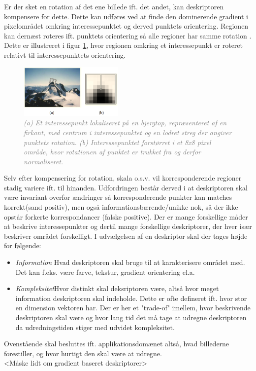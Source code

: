Er der sket en rotation af det ene billede ift. det andet, kan deskriptoren kompensere for dette. Dette kan udføres ved at finde den dominerende gradient i pixelområdet omkring interessepunktet og derved punktets orientering. Regionen kan dernæst roteres ift. punktets orientering så alle regioner har samme rotation \cite{bjerg}. Dette er illustreret i figur \ref{fig:bjerg}, hvor regionen omkring et interessepunkt er roteret relativt til interessepunktets orientering.
\begin{figure}[H]
    \centering
    \includegraphics[width=0.45\textwidth]{fig/21.png}
    \vspace{-0.5em} 
    \begin{center}
    \caption{\textcolor{gray}{\footnotesize \textit{
   (a) Et interessepunkt lokaliseret på en bjergtop,  repræsenteret af en firkant, med centrum i interessepunktet og en lodret streg der angiver punktets rotation. (b) Interessepunktet forstørret i et 8x8 pixel område, hvor rotationen af punktet er trukket fra og derfor normaliseret.}}}
    \label{fig:bjerg}
     \end{center}
  \end{figure}
       \vspace{-2.5em}
\noindent
Selv efter kompensering for rotation, skala o.s.v. vil korresponderende regioner stadig variere ift. til hinanden. Udfordringen består derved i at deskriptoren skal være invariant overfor ændringer så korresponderende punkter kan matches korrekt(sand positiv), men også informationsbærende/unikke nok, så der ikke opstår forkerte korrespondancer (falske positive). Der er mange forskellige måder at beskrive interessepunkter og dertil mange forskellige deskriptorer, der hver især beskriver området forskelligt. I udvælgelsen af en deskriptor skal der tages højde for følgende:
\begin{itemize}
\item{ \textit{Information} Hvad deskriptoren skal bruge til at karakterisere området med. Det kan f.eks. være farve, tekstur, gradient orientering el.a.}
\item{ \textit{Kompleksitet}Hvor distinkt skal deksriptoren være, altså hvor meget information deskriptoren skal indeholde. Dette er ofte defineret ift. hvor stor en dimension vektoren har. Der er her et "trade-of" imellem, hvor beskrivende deskriptoren skal være og hvor lang tid det må tage at udregne deskriptoren da udredningstiden stiger med udvidet kompleksitet.}
\end{itemize}
Ovenstående skal besluttes ift. applikationsdomænet altså, hvad billederne forestiller, og hvor hurtigt den skal være at udregne. \\
<Måske lidt om gradient baseret deskriptorer>